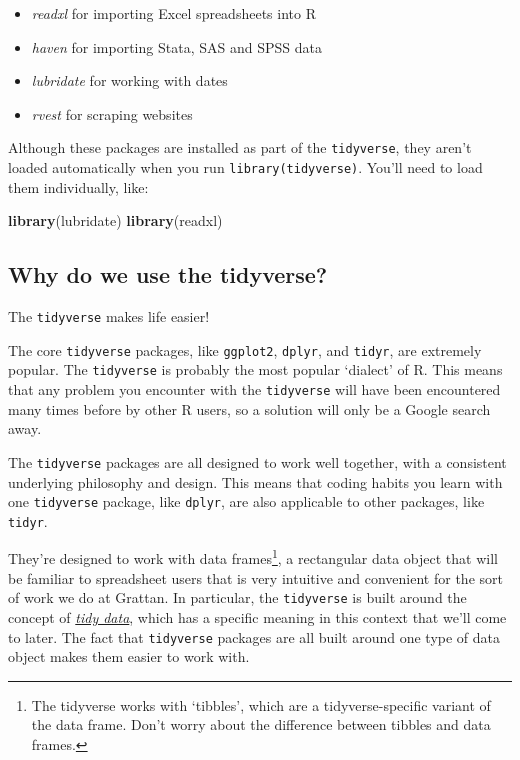 \documentclass[]{book}
\newenvironment{Shaded}{\begin{snugshade}}{\end{snugshade}}
\newcommand{\KeywordTok}[1]{\textcolor[rgb]{0.13,0.29,0.53}{\textbf{#1}}}
\newcommand{\NormalTok}[1]{#1}
\providecommand{\tightlist}{%
  \setlength{\itemsep}{0pt}\setlength{\parskip}{0pt}}
\let\rmarkdownfootnote\footnote%
\def\footnote{\protect\rmarkdownfootnote}
\begin{document}
\begin{itemize}
\tightlist
\item
  \emph{readxl} for importing Excel spreadsheets into R
\item
  \emph{haven} for importing Stata, SAS and SPSS data
\item
  \emph{lubridate} for working with dates
\item
  \emph{rvest} for scraping websites
\end{itemize}

Although these packages are installed as part of the \texttt{tidyverse}, they aren't loaded automatically when you run \texttt{library(tidyverse)}. You'll need to load them individually, like:

\begin{Shaded}
\begin{Highlighting}[]
\KeywordTok{library}\NormalTok{(lubridate)}
\KeywordTok{library}\NormalTok{(readxl)}
\end{Highlighting}
\end{Shaded}

\hypertarget{why-do-we-use-the-tidyverse}{%
\subsection{Why do we use the tidyverse?}\label{why-do-we-use-the-tidyverse}}

The \texttt{tidyverse} makes life easier!

The core \texttt{tidyverse} packages, like \texttt{ggplot2}, \texttt{dplyr}, and \texttt{tidyr}, are extremely popular. The \texttt{tidyverse} is probably the most popular `dialect' of R. This means that any problem you encounter with the \texttt{tidyverse} will have been encountered many times before by other R users, so a solution will only be a Google search away.

The \texttt{tidyverse} packages are all designed to work well together, with a consistent underlying philosophy and design. This means that coding habits you learn with one \texttt{tidyverse} package, like \texttt{dplyr}, are also applicable to other packages, like \texttt{tidyr}.

They're designed to work with data frames\footnote{The tidyverse works with `tibbles', which are a tidyverse-specific variant of the data frame. Don't worry about the difference between tibbles and data frames.}, a rectangular data object that will be familiar to spreadsheet users that is very intuitive and convenient for the sort of work we do at Grattan. In particular, the \texttt{tidyverse} is built around the concept of \href{https://cran.r-project.org/web/packages/tidyr/vignettes/tidy-data.html}{\emph{tidy data}}, which has a specific meaning in this context that we'll come to later. The fact that \texttt{tidyverse} packages are all built around one type of data object makes them easier to work with.
\end{document}
